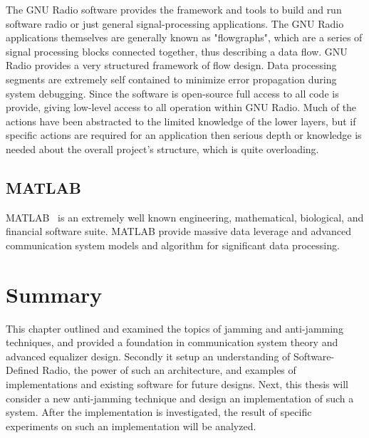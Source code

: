 The GNU Radio software provides the framework and tools to build and run software radio or just general signal-processing applications. The GNU Radio applications themselves are generally known as "flowgraphs", which are a series of signal processing blocks connected together, thus describing a data flow. GNU Radio provides a very structured framework of flow design. Data processing segments are extremely self contained to minimize error propagation during system debugging. Since the software is open-source full access to all code is provide, giving low-level access to all operation within GNU Radio. Much of the actions have been abstracted to the limited knowledge of the lower layers, but if specific actions are required for an application then serious depth or knowledge is needed about the overall project’s structure, which is quite overloading.

\subsection{MATLAB}
MATLAB~\cite{matlab} is an extremely well known engineering, mathematical, biological, and financial software suite. MATLAB provide massive data leverage and advanced communication system models and algorithm for significant data processing.


\section{Summary}
This chapter outlined and examined the topics of jamming and anti-jamming techniques, and provided a foundation in communication system theory and advanced equalizer design.  Secondly it setup an understanding of Software-Defined Radio, the power of such an architecture, and examples of implementations and existing software for future designs.  Next, this thesis will consider a new anti-jamming technique and design an implementation of such a system.  After the implementation is investigated, the result of specific experiments on such an implementation will be analyzed.\\
